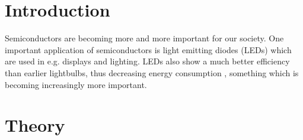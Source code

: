 \section{Introduction}
Semiconductors are becoming more and more important for our society. One important application of semiconductors is light emitting diodes (LEDs) \cite{hofmann2015} which are used in e.g. displays and lighting. LEDs also show a much better efficiency than earlier lightbulbs, thus decreasing energy consumption \cite{hofmann2015}, something which is becoming increasingly more important.

\section{Theory}
